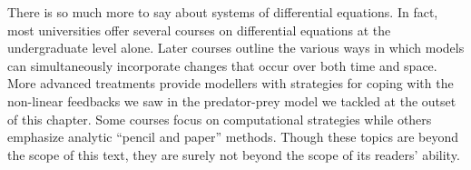 \documentclass[../book.tex]{subfiles}
\begin{document}
There is so much more to say about systems of differential equations. In fact, most universities offer several courses on differential equations at the undergraduate level alone. Later courses outline the various ways in which models can simultaneously incorporate changes that occur over both time and space. More advanced treatments provide modellers with strategies for coping with the non-linear feedbacks we saw in the predator-prey model we tackled at the outset of this chapter.  Some courses focus on computational strategies while others emphasize analytic ``pencil and paper'' methods. Though these topics are beyond the scope of this text, they are surely not beyond the scope of its readers' ability.
\end{document}
